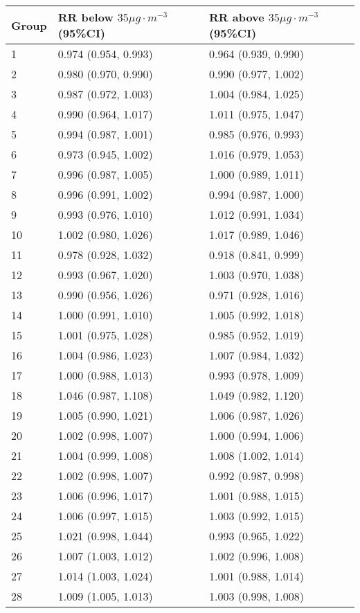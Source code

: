 \begin{tabular}{lll}
  \hline
Group & RR below $35 \mu g \cdot m^{-3}$ (95\%CI) & RR above $35 \mu g \cdot m^{-3}$ (95\%CI) \\ 
  \hline
   1 & 0.974 (0.954, 0.993) & 0.964 (0.939, 0.990) \\ 
     2 & 0.980 (0.970, 0.990) & 0.990 (0.977, 1.002) \\ 
     3 & 0.987 (0.972, 1.003) & 1.004 (0.984, 1.025) \\ 
     4 & 0.990 (0.964, 1.017) & 1.011 (0.975, 1.047) \\ 
     5 & 0.994 (0.987, 1.001) & 0.985 (0.976, 0.993) \\ 
     6 & 0.973 (0.945, 1.002) & 1.016 (0.979, 1.053) \\ 
     7 & 0.996 (0.987, 1.005) & 1.000 (0.989, 1.011) \\ 
     8 & 0.996 (0.991, 1.002) & 0.994 (0.987, 1.000) \\ 
     9 & 0.993 (0.976, 1.010) & 1.012 (0.991, 1.034) \\ 
    10 & 1.002 (0.980, 1.026) & 1.017 (0.989, 1.046) \\ 
    11 & 0.978 (0.928, 1.032) & 0.918 (0.841, 0.999) \\ 
    12 & 0.993 (0.967, 1.020) & 1.003 (0.970, 1.038) \\ 
    13 & 0.990 (0.956, 1.026) & 0.971 (0.928, 1.016) \\ 
    14 & 1.000 (0.991, 1.010) & 1.005 (0.992, 1.018) \\ 
    15 & 1.001 (0.975, 1.028) & 0.985 (0.952, 1.019) \\ 
    16 & 1.004 (0.986, 1.023) & 1.007 (0.984, 1.032) \\ 
    17 & 1.000 (0.988, 1.013) & 0.993 (0.978, 1.009) \\ 
    18 & 1.046 (0.987, 1.108) & 1.049 (0.982, 1.120) \\ 
    19 & 1.005 (0.990, 1.021) & 1.006 (0.987, 1.026) \\ 
    20 & 1.002 (0.998, 1.007) & 1.000 (0.994, 1.006) \\ 
    21 & 1.004 (0.999, 1.008) & 1.008 (1.002, 1.014) \\ 
    22 & 1.002 (0.998, 1.007) & 0.992 (0.987, 0.998) \\ 
    23 & 1.006 (0.996, 1.017) & 1.001 (0.988, 1.015) \\ 
    24 & 1.006 (0.997, 1.015) & 1.003 (0.992, 1.015) \\ 
    25 & 1.021 (0.998, 1.044) & 0.993 (0.965, 1.022) \\ 
    26 & 1.007 (1.003, 1.012) & 1.002 (0.996, 1.008) \\ 
    27 & 1.014 (1.003, 1.024) & 1.001 (0.988, 1.014) \\ 
    28 & 1.009 (1.005, 1.013) & 1.003 (0.998, 1.008) \\ 
   \hline
\end{tabular}


